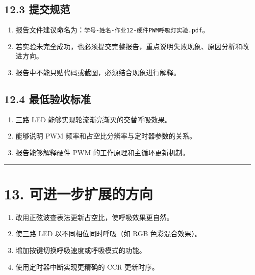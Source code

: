 \documentclass[
  chinese,
  UTF8,
  oneside,
  openany]{ctexbook}
\providecommand{\tightlist}{%
  \setlength{\itemsep}{0pt}\setlength{\parskip}{0pt}}
\begin{document}
\subsection{12.3 提交规范}\label{ux63d0ux4ea4ux89c4ux8303-7}

\begin{enumerate}
\def\labelenumi{\arabic{enumi}.}
\tightlist
\item
  报告文件建议命名为：\texttt{学号-姓名-作业12-硬件PWM呼吸灯实验.pdf}。
\item
  若实验未完全成功，也必须提交完整报告，重点说明失败现象、原因分析和改进方向。
\item
  报告中不能只贴代码或截图，必须结合现象进行解释。
\end{enumerate}

\subsection{12.4
最低验收标准}\label{ux6700ux4f4eux9a8cux6536ux6807ux51c6-7}

\begin{enumerate}
\def\labelenumi{\arabic{enumi}.}
\tightlist
\item
  三路 LED 能够实现轮流渐亮渐灭的交替呼吸效果。
\item
  能够说明 PWM 频率和占空比分辨率与定时器参数的关系。
\item
  报告能够解释硬件 PWM 的工作原理和主循环更新机制。
\end{enumerate}

\begin{center}\rule{0.5\linewidth}{0.5pt}\end{center}

\section{13.
可进一步扩展的方向}\label{ux53efux8fdbux4e00ux6b65ux6269ux5c55ux7684ux65b9ux5411-4}

\begin{enumerate}
\def\labelenumi{\arabic{enumi}.}
\tightlist
\item
  改用正弦波查表法更新占空比，使呼吸效果更自然。
\item
  使三路 LED 以不同相位同时呼吸（如 RGB 色彩混合效果）。
\item
  增加按键切换呼吸速度或呼吸模式的功能。
\item
  使用定时器中断实现更精确的 CCR 更新时序。
\end{enumerate}
\end{document}
